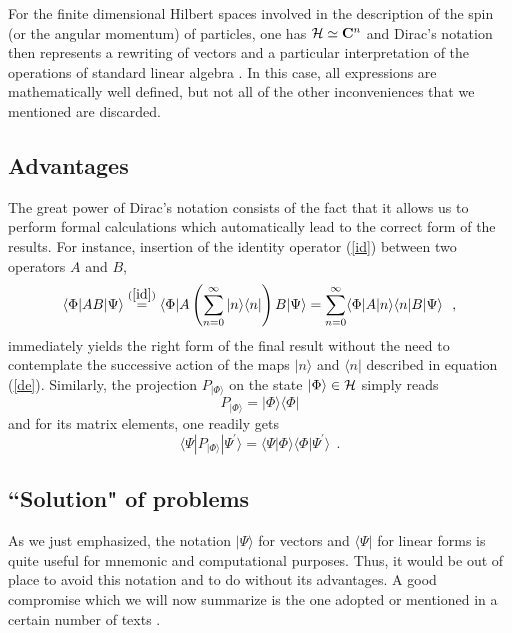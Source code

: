 \documentclass[12pt]{report}
\begin{document}
For the finite dimensional Hilbert spaces 
involved in the description of the spin (or the angular momentum) of
particles, one has ${\cal H} \simeq {\bf C}^n$ and Dirac's notation 
then represents a rewriting of vectors and 
a particular interpretation of the operations 
of standard linear algebra \cite{fano}.
In this case, all expressions are mathematically well defined, 
but not all of the other inconveniences that we mentioned are 
discarded. 

 
 
\subsection{Advantages}
 
 The great power of Dirac's notation consists of the fact that 
it allows us to perform formal calculations 
  which automatically lead to the correct form of the results. 
  For instance, insertion of the identity operator (\ref{id})
  between two operators $A$ and $B$,
\begin{equation}
\label{in1}
\langle \Phi | AB| \Psi \rangle 
\stackrel{(\ref{id})}{=}
\langle \Phi | A
\left( \sum_{n=0}^{\infty} |n \rangle
\langle n | \right)  B| \Psi \rangle
= \sum_{n=0}^{\infty}
\langle \Phi | A| n \rangle
\langle n | B| \Psi \rangle
\ \ ,
\end{equation}
immediately yields the right form of the 
final result without the need
to contemplate the successive action of the maps 
$|n \rangle$ and $\langle n |$ described in equation 
(\ref{de}).
Similarly, the projection $P_{|\Phi \rangle}$
on the state $|\Phi \rangle \in {\cal H}$ simply reads
\begin{equation}
\label{in2}
P_{|\Phi \rangle} =
|\Phi \rangle \langle \Phi |
\end{equation}
and for its matrix elements, one readily gets  
\begin{equation}
\langle \Psi | P_{|\Phi \rangle} | \Psi^{\prime} \rangle =
\langle \Psi | \Phi \rangle  \langle \Phi | \Psi^{\prime} \rangle
\ \ .
\end{equation}
 
 
\subsection{``Solution" of problems}
 
As we just emphasized, the notation $| \Psi \rangle$
for vectors and $\langle \Psi |$ for linear forms is 
quite useful for mnemonic and 
computational purposes. 
Thus, it would be out of place to avoid this notation and to 
do without its advantages. 
A good compromise which we will now summarize is the one adopted 
or mentioned in a certain number of texts \cite{gap,ll,pd,th}.
 
\end{document}
